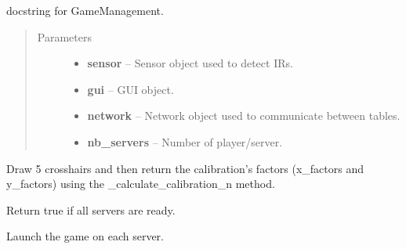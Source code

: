 \documentclass[letterpaper,10pt,english]{sphinxmanual}
\begin{document}
\begin{fulllineitems}
\label{api:game.GameManagement}
docstring for GameManagement.
\begin{quote}\begin{description}
\item[{Parameters}] \leavevmode\begin{itemize}
\item {} 
\textbf{sensor} -- Sensor object used to detect IRs.

\item {} 
\textbf{gui} -- GUI object.

\item {} 
\textbf{network} -- Network object used to communicate between tables.

\item {} 
\textbf{nb\_servers} -- Number of player/server.

\end{itemize}

\end{description}\end{quote}

\begin{fulllineitems}
\label{api:game.GameManagement.do_calibration}
Draw 5 crosshairs and then return the calibration's factors
(x\_factors and y\_factors) using the \_calculate\_calibration\_n method.

\end{fulllineitems}


\begin{fulllineitems}
\label{api:game.GameManagement.is_servers_ready}
Return true if all servers are ready.

\end{fulllineitems}


\begin{fulllineitems}
\label{api:game.GameManagement.launch_game}
Launch the game on each server.


\end{fulllineitems}
\end{fulllineitems}
\end{document}
